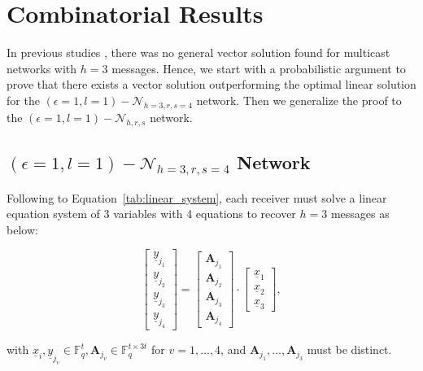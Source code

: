 \chapter{Combinatorial Results} \label{chap:comb_res}

In previous studies \cite{Wachter-Zeh:2018}, there was no general
vector solution found for multicast networks with $h=3$ messages.
Hence, we start with a probabilistic argument to prove that there
exists a vector solution outperforming the optimal linear solution
for the $\left(\epsilon=1,l=1\right)-\mathcal{N}_{h=3,r,s=4}$ network.
Then we generalize the proof to the $\left(\epsilon=1,l=1\right)-\mathcal{N}_{h,r,s}$
network.

\section{$\left(\epsilon=1,l=1\right)-\mathcal{N}_{h=3,r,s=4}$ Network}

\noindent{}

Following to Equation~\ref{tab:linear_system}, each receiver must
solve a linear equation system of 3 variables with 4 equations to
recover $h=3$ messages as below:

\[
\left[\begin{array}{c}
\underline{y}_{j_{1}}\\
\underline{y}_{j_{2}}\\
\underline{y}_{j_{3}}\\
\underline{y}_{j_{4}}
\end{array}\right]=\left[\begin{array}{c}
\boldsymbol{A}_{j_{1}}\\
\boldsymbol{A}_{j_{2}}\\
\boldsymbol{A}_{j_{3}}\\
\boldsymbol{A}_{j_{4}}
\end{array}\right]\cdot\left[\begin{array}{c}
\underline{x}_{1}\\
\underline{x}_{2}\\
\underline{x}_{3}
\end{array}\right],
\]

with $\underline{x}_{i},\underline{y}_{j_{v}}\in\ensuremath{\mathbb{F}}_{q}^{t},\boldsymbol{A}_{j_{v}}\in\ensuremath{\mathbb{F}}_{q}^{t\times3t}$
for $v=1,\ldots,4$, and $\boldsymbol{A}_{j_{1}},\ldots,\boldsymbol{A}_{j_{3}}$
must be distinct.

